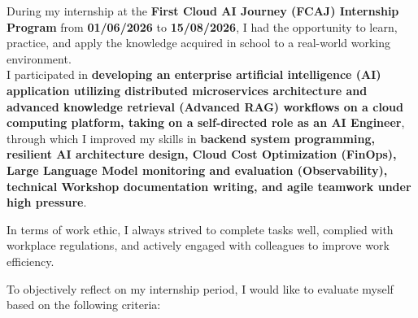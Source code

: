 During my internship at the \textbf{First Cloud AI Journey (FCAJ)
Internship Program} from \textbf{01/06/2026} to \textbf{15/08/2026}, I
had the opportunity to learn, practice, and apply the knowledge acquired
in school to a real-world working environment.\\
I participated in \textbf{developing an enterprise artificial
intelligence (AI) application utilizing distributed microservices
architecture and advanced knowledge retrieval (Advanced RAG) workflows
on a cloud computing platform, taking on a self-directed role as an AI
Engineer}, through which I improved my skills in \textbf{backend system
programming, resilient AI architecture design, Cloud Cost Optimization
(FinOps), Large Language Model monitoring and evaluation
(Observability), technical Workshop documentation writing, and agile
teamwork under high pressure}.

In terms of work ethic, I always strived to complete tasks well,
complied with workplace regulations, and actively engaged with
colleagues to improve work efficiency.

To objectively reflect on my internship period, I would like to evaluate
myself based on the following criteria:

